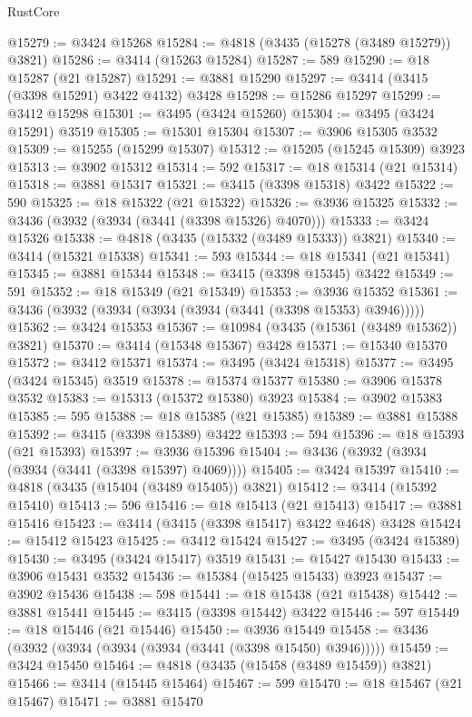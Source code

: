 \begin{lexlean}{RustCore}
\begin{coremodule}
@15279 := @3424 @15268
@15284 := @4818 (@3435 (@15278 (@3489 @15279)) @3821)
@15286 := @3414 (@15263 @15284)
@15287 := 589
@15290 := @18 @15287 (@21 @15287)
@15291 := @3881 @15290
@15297 := @3414 (@3415 (@3398 @15291) @3422 @4132) @3428
@15298 := @15286 @15297
@15299 := @3412 @15298
@15301 := @3495 (@3424 @15260)
@15304 := @3495 (@3424 @15291) @3519
@15305 := @15301 @15304
@15307 := @3906 @15305 @3532
@15309 := @15255 (@15299 @15307)
@15312 := @15205 (@15245 @15309) @3923
@15313 := @3902 @15312
@15314 := 592
@15317 := @18 @15314 (@21 @15314)
@15318 := @3881 @15317
@15321 := @3415 (@3398 @15318) @3422
@15322 := 590
@15325 := @18 @15322 (@21 @15322)
@15326 := @3936 @15325
@15332 := @3436 (@3932 (@3934 (@3441 (@3398 @15326) @4070)))
@15333 := @3424 @15326
@15338 := @4818 (@3435 (@15332 (@3489 @15333)) @3821)
@15340 := @3414 (@15321 @15338)
@15341 := 593
@15344 := @18 @15341 (@21 @15341)
@15345 := @3881 @15344
@15348 := @3415 (@3398 @15345) @3422
@15349 := 591
@15352 := @18 @15349 (@21 @15349)
@15353 := @3936 @15352
@15361 := @3436 (@3932 (@3934 (@3934 (@3934 (@3441 (@3398 @15353) @3946)))))
@15362 := @3424 @15353
@15367 := @10984 (@3435 (@15361 (@3489 @15362)) @3821)
@15370 := @3414 (@15348 @15367) @3428
@15371 := @15340 @15370
@15372 := @3412 @15371
@15374 := @3495 (@3424 @15318)
@15377 := @3495 (@3424 @15345) @3519
@15378 := @15374 @15377
@15380 := @3906 @15378 @3532
@15383 := @15313 (@15372 @15380) @3923
@15384 := @3902 @15383
@15385 := 595
@15388 := @18 @15385 (@21 @15385)
@15389 := @3881 @15388
@15392 := @3415 (@3398 @15389) @3422
@15393 := 594
@15396 := @18 @15393 (@21 @15393)
@15397 := @3936 @15396
@15404 := @3436 (@3932 (@3934 (@3934 (@3441 (@3398 @15397) @4069))))
@15405 := @3424 @15397
@15410 := @4818 (@3435 (@15404 (@3489 @15405)) @3821)
@15412 := @3414 (@15392 @15410)
@15413 := 596
@15416 := @18 @15413 (@21 @15413)
@15417 := @3881 @15416
@15423 := @3414 (@3415 (@3398 @15417) @3422 @4648) @3428
@15424 := @15412 @15423
@15425 := @3412 @15424
@15427 := @3495 (@3424 @15389)
@15430 := @3495 (@3424 @15417) @3519
@15431 := @15427 @15430
@15433 := @3906 @15431 @3532
@15436 := @15384 (@15425 @15433) @3923
@15437 := @3902 @15436
@15438 := 598
@15441 := @18 @15438 (@21 @15438)
@15442 := @3881 @15441
@15445 := @3415 (@3398 @15442) @3422
@15446 := 597
@15449 := @18 @15446 (@21 @15446)
@15450 := @3936 @15449
@15458 := @3436 (@3932 (@3934 (@3934 (@3934 (@3441 (@3398 @15450) @3946)))))
@15459 := @3424 @15450
@15464 := @4818 (@3435 (@15458 (@3489 @15459)) @3821)
@15466 := @3414 (@15445 @15464)
@15467 := 599
@15470 := @18 @15467 (@21 @15467)
@15471 := @3881 @15470

\end{coremodule}
\end{lexlean}
